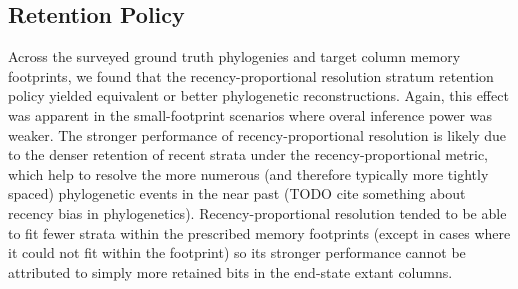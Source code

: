 \subsection{Retention Policy}

Across the surveyed ground truth phylogenies and target column memory footprints, we found that the recency-proportional resolution stratum retention policy yielded equivalent or better phylogenetic reconstructions.
Again, this effect was apparent in the small-footprint scenarios where overal inference power was weaker.
The stronger performance of recency-proportional resolution is likely due to the denser retention of recent strata under the recency-proportional metric, which help to resolve the more numerous (and therefore typically more tightly spaced) phylogenetic events in the near past (TODO cite something about recency bias in phylogenetics).
Recency-proportional resolution tended to be able to fit fewer strata within the prescribed memory footprints (except in cases where it could not fit within the footprint) so its stronger performance cannot be attributed to simply more retained bits in the end-state extant columns.


